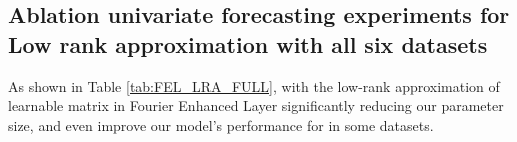 \documentclass{article}
\begin{document}
\subsection{Ablation univariate forecasting experiments for Low rank approximation with all six datasets}
As shown in Table \ref{tab:FEL_LRA_FULL}, with the low-rank approximation of learnable matrix in Fourier Enhanced Layer significantly reducing our parameter size, and even improve our model's performance for in some datasets.
\begin{table*}[h]

\centering
\caption{Low-rank Approximation (LRA) univariate forecasting study for frequency enhanced layer: Comp. K=0 means default version without LRA, 1 means the largest compression using K=1.}
\end{table*}
\end{document}
